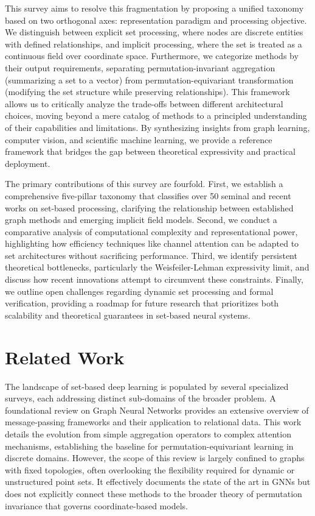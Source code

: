 \documentclass{article}
\begin{document}
This survey aims to resolve this fragmentation by proposing a unified taxonomy based on two orthogonal axes: representation paradigm and processing objective. We distinguish between explicit set processing, where nodes are discrete entities with defined relationships, and implicit processing, where the set is treated as a continuous field over coordinate space. Furthermore, we categorize methods by their output requirements, separating permutation-invariant aggregation (summarizing a set to a vector) from permutation-equivariant transformation (modifying the set structure while preserving relationships). This framework allows us to critically analyze the trade-offs between different architectural choices, moving beyond a mere catalog of methods to a principled understanding of their capabilities and limitations. By synthesizing insights from graph learning, computer vision, and scientific machine learning, we provide a reference framework that bridges the gap between theoretical expressivity and practical deployment.

The primary contributions of this survey are fourfold. First, we establish a comprehensive five-pillar taxonomy that classifies over 50 seminal and recent works on set-based processing, clarifying the relationship between established graph methods and emerging implicit field models. Second, we conduct a comparative analysis of computational complexity and representational power, highlighting how efficiency techniques like channel attention can be adapted to set architectures without sacrificing performance. Third, we identify persistent theoretical bottlenecks, particularly the Weisfeiler-Lehman expressivity limit, and discuss how recent innovations attempt to circumvent these constraints. Finally, we outline open challenges regarding dynamic set processing and formal verification, providing a roadmap for future research that prioritizes both scalability and theoretical guarantees in set-based neural systems.

\section{Related Work}

\label{sec:related_work}

The landscape of set-based deep learning is populated by several specialized surveys, each addressing distinct sub-domains of the broader problem. A foundational review on Graph Neural Networks provides an extensive overview of message-passing frameworks and their application to relational data. This work details the evolution from simple aggregation operators to complex attention mechanisms, establishing the baseline for permutation-equivariant learning in discrete domains. However, the scope of this review is largely confined to graphs with fixed topologies, often overlooking the flexibility required for dynamic or unstructured point sets. It effectively documents the state of the art in GNNs but does not explicitly connect these methods to the broader theory of permutation invariance that governs coordinate-based models.
\end{document}

